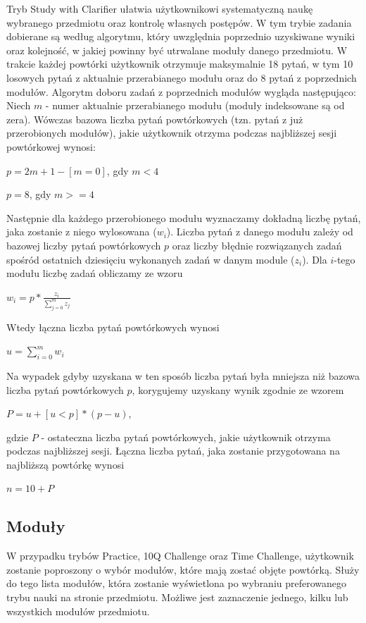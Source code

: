 \documentclass{pracamgr}
\begin{document}
\newpage Tryb Study with Clarifier ułatwia użytkownikowi systematyczną naukę wybranego przedmiotu oraz kontrolę własnych postępów. W tym trybie zadania dobierane są według algorytmu, który uwzględnia poprzednio uzyskiwane wyniki oraz kolejność, w jakiej powinny być utrwalane moduły danego przedmiotu. W trakcie każdej powtórki użytkownik otrzymuje maksymalnie 18 pytań, w tym 10 losowych pytań z aktualnie przerabianego modułu oraz do 8 pytań z poprzednich modułów. Algorytm doboru zadań z poprzednich modułów wygląda następująco:
\newline
\newline
Niech $m$ - numer aktualnie przerabianego modułu (moduły indeksowane są od zera).
\newline Wówczas bazowa liczba pytań powtórkowych (tzn. pytań z już przerobionych modułów), jakie użytkownik otrzyma podczas najbliższej sesji powtórkowej wynosi:
\begin{center}
$p = 2m + 1 - [m=0]$, gdy $m < 4$
\end{center}
\begin{center}
$p = 8$, gdy $m >= 4$
\end{center}
Następnie dla każdego przerobionego modułu wyznaczamy dokładną liczbę pytań, jaka zostanie z niego wylosowana ($w_{i}$). Liczba pytań z danego modułu zależy od bazowej liczby pytań powtórkowych $p$ oraz liczby błędnie rozwiązanych zadań spośród ostatnich dziesięciu wykonanych zadań w danym module ($z_{i}$). Dla $i$-tego modułu liczbę zadań obliczamy ze wzoru
\begin{center}
$w_{i} = p * \frac{z_{i}}{\sum_{j=0}^m z_{j}}$
\end{center}
Wtedy łączna liczba pytań powtórkowych wynosi
\begin{center}
$u = \sum_{i=0}^m w_{i}$
\end{center}
Na wypadek gdyby uzyskana w ten sposób liczba pytań była mniejsza niż bazowa liczba pytań powtórkowych $p$, korygujemy uzyskany wynik zgodnie ze wzorem
\begin{center}
$P = u + [u<p]*(p-u)$,
\end{center}
gdzie $P$ - ostateczna liczba pytań powtórkowych, jakie użytkownik otrzyma podczas najbliższej sesji. Łączna liczba pytań, jaka zostanie przygotowana na najbliższą powtórkę wynosi
\begin{center}
$n = 10 + P$
\end{center}

\subsection{Moduły}
W przypadku trybów Practice, 10Q Challenge oraz Time Challenge, użytkownik zostanie poproszony o wybór modułów, które mają zostać objęte powtórką. Służy do tego lista modułów, która zostanie wyświetlona po wybraniu preferowanego trybu nauki na stronie przedmiotu. Możliwe jest zaznaczenie jednego, kilku lub wszystkich modułów przedmiotu.
\end{document}
